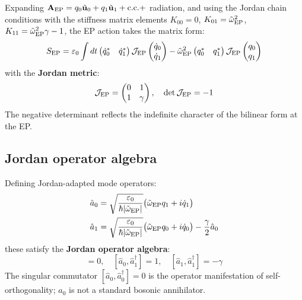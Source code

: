 \documentclass[12pt]{article}
\newcommand{\q}{{\rm q}}
\newcommand{\EP}{{\rm EP}}
\newcommand{\tu}{\tilde{\mathbf{u}}}
\newcommand{\tomega}{\tilde{\omega}}
\begin{document}
Expanding $\mathbf{A}_\EP = q_0\tu_0 + q_1\tu_1 + \mathrm{c.c.} +$
radiation, and using the Jordan chain conditions with the stiffness
matrix elements $K_{00}=0$, $K_{01}=\tomega_\EP^2$,
$K_{11}=\tomega_\EP^2\gamma-1$, the EP action takes the matrix form:
\begin{equation}
  S_\EP = \varepsilon_0\int dt
  \begin{pmatrix}\dot{q}_0^* & \dot{q}_1^*\end{pmatrix}
  \mathcal{J}_\EP
  \begin{pmatrix}\dot{q}_0\\\dot{q}_1\end{pmatrix}
  -\tomega_\EP^2
  \begin{pmatrix}q_0^* & q_1^*\end{pmatrix}
  \mathcal{J}_\EP
  \begin{pmatrix}q_0\\q_1\end{pmatrix}
  \label{eq:ep_action}
\end{equation}
with the \textbf{Jordan metric}:
\begin{equation}
  \mathcal{J}_\EP =
  \begin{pmatrix}0 & 1\\1 & \gamma\end{pmatrix},\quad
  \det\mathcal{J}_\EP = -1
  \label{eq:jordan_metric}
\end{equation}
The negative determinant reflects the indefinite character of the
bilinear form at the EP.

\subsection{Jordan operator algebra}

Defining Jordan-adapted mode operators:
\begin{align}
  \hat{a}_0 &= \sqrt{\frac{\varepsilon_0}{\hbar|\tomega_\EP|}}
  \bigl(\tomega_\EP q_1+i\dot{q}_1\bigr)
  \label{eq:a0_EP}\\
  \hat{a}_1 &= \sqrt{\frac{\varepsilon_0}{\hbar|\tomega_\EP|}}
  \bigl(\tomega_\EP q_0+i\dot{q}_0\bigr)-\frac{\gamma}{2}\hat{a}_0
  \label{eq:a1_EP}
\end{align}
these satisfy the \textbf{Jordan operator algebra}:
\begin{equation}
  [\hat{a}_0,\hat{a}_0^\dagger]=0,\quad
  [\hat{a}_0,\hat{a}_1^\dagger]=1,\quad
  [\hat{a}_1,\hat{a}_1^\dagger]=-\gamma
  \label{eq:jordan_algebra}
\end{equation}
The singular commutator $[\hat{a}_0,\hat{a}_0^\dagger]=0$ is the
operator manifestation of self-orthogonality; $\hat{a}_0$ is not a
standard bosonic annihilator.
\end{document}
